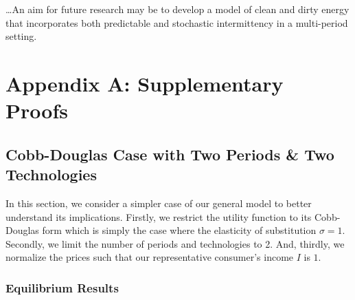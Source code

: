 \documentclass[11pt,a4paper]{extarticle}
\begin{document}
\dots An aim for future research may be to develop a model of clean and dirty energy that incorporates both predictable and stochastic intermittency in a multi-period setting. 



\pagebreak

\section{Appendix A: Supplementary Proofs}

\subsection{Cobb-Douglas Case with Two Periods \& Two Technologies}
\label{sec:cobbdoug}

In this section, we consider a simpler case of our general model to better understand its implications. Firstly, we restrict the utility function to its Cobb-Douglas form which is simply the case where the elasticity of substitution $\sigma = 1$. Secondly, we limit the number of periods and technologies to 2. And, thirdly, we normalize the prices such that our representative consumer's income $I$ is $1$.

\subsubsection{Equilibrium Results}
\end{document}
